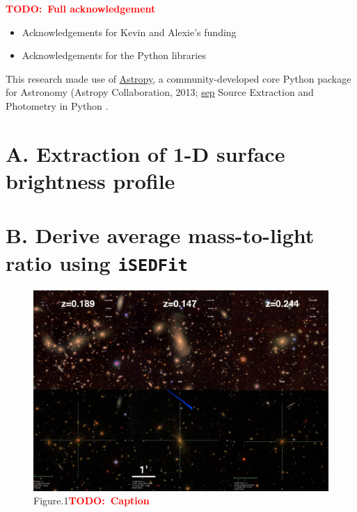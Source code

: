 \documentclass[preprint]{aastex}
\newcommand{\todo}[1]{\textcolor{red}{\textbf{TODO:~#1}}}
\begin{document}
\begin{CJK*}{UTF8}{gbsn}
  \todo{Full acknowledgement}\\
  \begin{itemize}
      \item Acknowledgements for Kevin and Alexie's funding 
      \item Acknowledgements for the Python libraries
  \end{itemize}

  This research made use of 
  \href{http://www.astropy.org/}{Astropy}, a community-developed 
  core Python package for Astronomy (Astropy Collaboration, 2013; 
  \href{https://github.com/kbarbary/sep}{sep} 
  Source Extraction and Photometry in Python \citep{PythonSEP}.






\appendix

\section{A. Extraction of 1-D surface brightness profile} 

\section{B. Derive average mass-to-light ratio using \texttt{iSEDFit}} 


\clearpage
{}
\begin{figure}
    \centering 
    \includegraphics[width=15.5cm]{fig/fig1.png}
    \caption{Figure.1\todo{Caption}}
    \label{figure:1}
\end{figure}


\end{CJK*}
\end{document}
